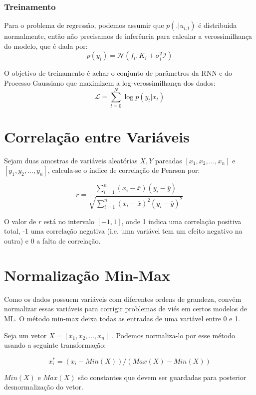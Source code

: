 \subsubsection{Treinamento}

Para o problema de regressão, podemos assumir que $p(. | u_{i,t})$ é distribuida
normalmente, então não precisamos de inferência para calcular a verossimilhança do modelo, que é dada por: \\

\[
p(y_{i}) = \mathcal{N}(f_i,K_i + \sigma_i^2\mathcal{I})
\]

O objetivo de treinamento é achar o conjunto de parâmetros da RNN e do Processo Gaussiano que maximizem a log-verossimilhança dos dados: \\
\[
\mathcal{L} = \sum_{t=0}^N{\log p(y_t|x_t)}
\]



\section{Correlação entre Variáveis}

Sejam duas amostras de variáveis aleatórias $X,Y$ pareadas $[x_1,x_2, \dots ,
x_n]$ e $[y_1,y_2, \dots , y_n]$, calcula-se o índice de correlação de Pearson por:



\[ r = \frac{{}\sum_{i=1}^{n} (x_i - \overline{x})(y_i - \overline{y})}
  {\sqrt{\sum_{i=1}^{n} (x_i - \overline{x})^2(y_i - \overline{y})^2}} \] 


O valor de $r$ está no intervalo $[-1,1]$, onde 1 indica uma correlação positiva
total, -1 uma correlação negativa (i.e. uma variável tem um efeito negativo na
outra) e 0 a falta de correlação.


\section{Normalização Min-Max}

Como os dados possuem variáveis com diferentes ordens de grandeza, convém
normalizar essas variáveis para corrigir problemas de viés em certos modelos de
ML. O método min-max deixa todas as entradas de uma variável entre 0 e 1.

Seja um vetor $X =[x_1,x_2,\dots,x_n]$ . Podemos normaliza-lo por esse método usando a
seguinte transformação:

\[
  x^*_{i} = ( x_i - Min(X))/(Max(X) - Min(X)) 
\]

$Min(X)$  e $Max(X)$ são constantes que devem ser guardadas para posterior
desnormalização do vetor.



